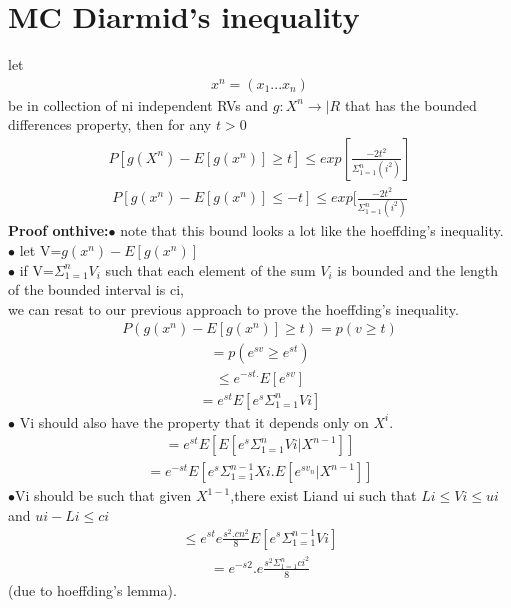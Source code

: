 \documentclass[journal,12pt,twocolumn]{IEEEtran}
\begin{document}
\section{MC Diarmid's inequality}
let 
\begin{align}
x^n=(x_1...x_n)
\end{align}
be in collection of ni independent RVs and $g:X^n \rightarrow |R$ that has the bounded differences property, then for any $t>0$\\
\begin{align}
P[g(X^n)-E[g(x^n)] \geqslant t] \leqslant exp[\frac{-2t^2}{\Sigma_{1=1}^{n}(i^2)}]
\end{align}
\begin{align}
P[g(x^n)-E[g(x^n)] \leqslant -t] \leqslant exp[\frac{-2t^2}{\Sigma_{1=1}^{n}(i^2)}
\end{align}
\textbf{Proof onthive:}$\bullet$ note that this bound looks a lot like the hoeffding's inequality.\\

$\bullet$ let V=$g(x^n)-E[g(x^n)]$\\

$\bullet$ if V=$\Sigma_{1=1}^{n} V_i$ such that each element of the sum $V_i$ is bounded and the length of the bounded interval is ci,\\
 
we can resat to our previous approach to prove the hoeffding's inequality.
\begin{align}
P(g(x^n)-E[g(x^n)]\geqslant t)= p(v\geqslant t)
\end{align}
\begin{align}
=p(e^{sv} \geqslant e^{st})
\end{align}
\begin{align}
\leqslant e^{-st.}E[e^{sv}]
\end{align}
\begin{align}
=e^{st} E[e^{s}\Sigma_{1=1}^{n} Vi]
\end{align}
$\bullet$ Vi should also have the property that it depends only on $X^i.$\\

\begin{align}
=e^{st} E[E[e^{s} \Sigma_{1=1}^{n} Vi|X^{n-1}]]
\end{align}
\begin{align}
=e^{-st} E[e^s \Sigma_{1=1}^{n-1} Xi. E[e^{sv_n}|X^{n-1}]]
\end{align}
$\bullet$Vi should be such that given $X^{1-1}$,there exist Liand ui such that $Li\leqslant Vi\leqslant ui$ and $ ui-Li \leqslant ci$\\
\begin{align}
\leqslant e^{st} e\frac{s^2.cn^2}{8}E[e^{s} \Sigma_{1=1}^{n-1} Vi]
\end{align}
\begin{align}
=e^{-s2}.e\frac{s^2\Sigma_{1=1}^{n}ci^2}{8}
\end{align}
(due to hoeffding's lemma).
\end{document}
